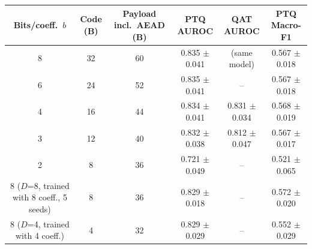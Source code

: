 \begin{tabular}{cccccc}
\toprule
Bits/coeff.\ $b$ & Code (B) & Payload incl.\ AEAD (B) & PTQ AUROC & QAT AUROC & PTQ Macro-F1 \\
\midrule
8 & 32 & 60 & 0.835 $\pm$ 0.041 & (same model) & 0.567 $\pm$ 0.018 \\
6 & 24 & 52 & 0.835 $\pm$ 0.041 & -- & 0.567 $\pm$ 0.018 \\
4 & 16 & 44 & 0.834 $\pm$ 0.041 & 0.831 $\pm$ 0.034 & 0.568 $\pm$ 0.019 \\
3 & 12 & 40 & 0.832 $\pm$ 0.038 & 0.812 $\pm$ 0.047 & 0.567 $\pm$ 0.017 \\
2 & 8 & 36 & 0.721 $\pm$ 0.049 & -- & 0.521 $\pm$ 0.065 \\
8 ($D$=8, trained with 8 coeff., 5 seeds) & 8 & 36 & 0.829 $\pm$ 0.018 & -- & 0.572 $\pm$ 0.020 \\
8 ($D$=4, trained with 4 coeff.) & 4 & 32 & 0.829 $\pm$ 0.029 & -- & 0.552 $\pm$ 0.029 \\
\bottomrule
\end{tabular}
